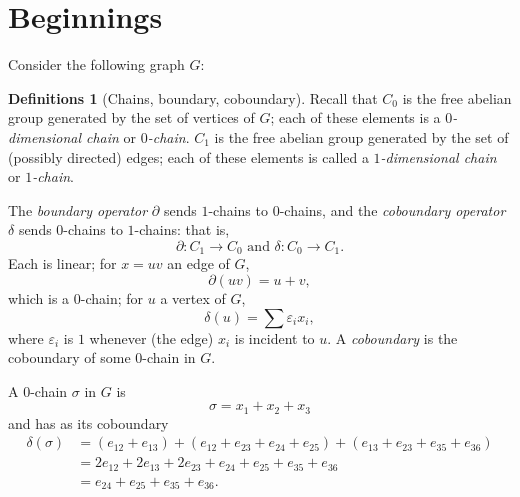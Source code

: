 \documentclass[11pt]{article}
\theoremstyle{definition}
\newtheorem*{definitions*}{Definitions}
\begin{document}
	\section*{Beginnings}
		Consider the following graph $G$:
		\begin{center}
		\end{center}	

		\begin{definitions*}[Chains, boundary, coboundary]
			Recall that $C_0$ is the free abelian group generated by the set of vertices of $G$; each of these elements is a \textit{$0$-dimensional chain} or \textit{$0$-chain}. $C_1$ is the free abelian group generated by the set of (possibly directed) edges; each of these elements is called a \textit{$1$-dimensional chain} or \textit{$1$-chain}.
			
			The \textit{boundary operator} $\partial$ sends $1$-chains to $0$-chains, and the \textit{coboundary operator} $\delta$ sends $0$-chains to $1$-chains: that is, $$ \partial : C_1 \to C_0 \text{ and } \delta : C_0 \to C_1. $$ Each is linear; for $x=uv$ an edge of $G$, $$ \partial(uv) = u + v,$$ which is a $0$-chain; for $u$ a vertex of $G$, $$ \delta(u) = \sum \varepsilon_i x_i,$$ where $\varepsilon_i$ is $1$ whenever (the edge) $x_i$ is incident to $u$. A \textit{coboundary} is the coboundary of some $0$-chain in $G$.
		\end{definitions*}
		
		A $0$-chain $\sigma$ in $G$ is $$\sigma = x_1 + x_2 + x_3$$ and has as its coboundary
		\begin{align*}
 			\delta(\sigma) &= (e_{12} + e_{13}) + (e_{12} + e_{23} + e_{24} + e_{25}) + (e_{13} + e_{23} + e_{35} + e_{36}) \\
 			&= 2e_{12} + 2e_{13} + 2e_{23} + e_{24} + e_{25} + e_{35} + e_{36} \\
 			&= e_{24} + e_{25} + e_{35} + e_{36}.
		\end{align*}
		
\end{document}
